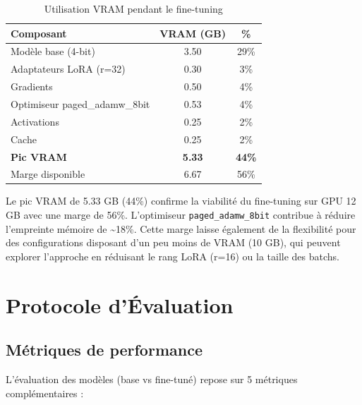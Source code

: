 \begin{table}[h]
\centering
\caption{Utilisation VRAM pendant le fine-tuning}
\label{tab:vram_usage}
\begin{tabular}{@{}lcc@{}}
\toprule
\textbf{Composant} & \textbf{VRAM (GB)} & \textbf{\%} \\ \midrule
Modèle base (4-bit) & 3.50 & 29\% \\
Adaptateurs LoRA (r=32) & 0.30 & 3\% \\
Gradients & 0.50 & 4\% \\
Optimiseur paged\_adamw\_8bit & 0.53 & 4\% \\
Activations & 0.25 & 2\% \\
Cache & 0.25 & 2\% \\
\textbf{Pic VRAM} & \textbf{5.33} & \textbf{44\%} \\ \midrule
Marge disponible & 6.67 & 56\% \\
\bottomrule
\end{tabular}
\end{table}

Le pic VRAM de 5.33 GB (44\%) confirme la viabilité du fine-tuning sur GPU 12 GB avec une marge de 56\%. L'optimiseur \texttt{paged\_adamw\_8bit} contribue à réduire l'empreinte mémoire de \textasciitilde{}18\%. Cette marge laisse également de la flexibilité pour des configurations disposant d'un peu moins de VRAM (10 GB), qui peuvent explorer l'approche en réduisant le rang LoRA (r=16) ou la taille des batchs.

\section{Protocole d'Évaluation}

\subsection{Métriques de performance}

L'évaluation des modèles (base vs fine-tuné) repose sur 5 métriques complémentaires :

